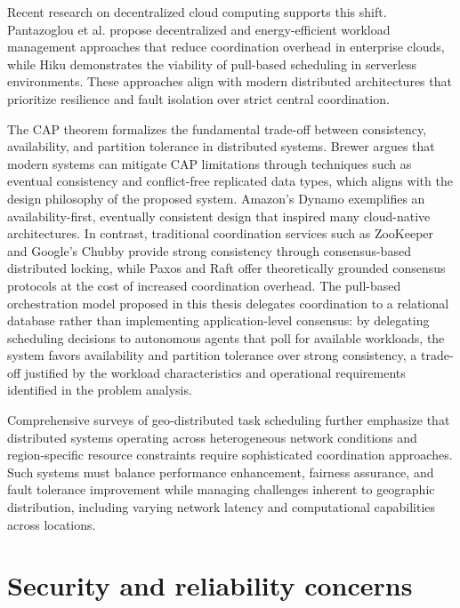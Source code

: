 Recent research on decentralized cloud computing supports this shift. Pantazoglou et al. \cite{pantazoglou2015decentralized} propose decentralized and energy-efficient workload management approaches that reduce coordination overhead in enterprise clouds, while Hiku \cite{hiku2025pull} demonstrates the viability of pull-based scheduling in serverless environments. These approaches align with modern distributed architectures that prioritize resilience and fault isolation over strict central coordination.

The CAP theorem \cite{brewer2012cap, gilbert2012cap} formalizes the fundamental trade-off between consistency, availability, and partition tolerance in distributed systems. Brewer \cite{brewer2012cap} argues that modern systems can mitigate CAP limitations through techniques such as eventual consistency and conflict-free replicated data types, which aligns with the design philosophy of the proposed system. Amazon's Dynamo \cite{decandia2007dynamo} exemplifies an availability-first, eventually consistent design that inspired many cloud-native architectures. In contrast, traditional coordination services such as ZooKeeper \cite{hunt2010zookeeper} and Google's Chubby \cite{burrows2006chubby} provide strong consistency through consensus-based distributed locking, while Paxos \cite{lamport2001paxos} and Raft \cite{ongaro2014raft} offer theoretically grounded consensus protocols at the cost of increased coordination overhead. The pull-based orchestration model proposed in this thesis delegates coordination to a relational database rather than implementing application-level consensus: by delegating scheduling decisions to autonomous agents that poll for available workloads, the system favors availability and partition tolerance over strong consistency, a trade-off justified by the workload characteristics and operational requirements identified in the problem analysis.

Comprehensive surveys of geo-distributed task scheduling \cite{wu2025task} further emphasize that distributed systems operating across heterogeneous network conditions and region-specific resource constraints require sophisticated coordination approaches. Such systems must balance performance enhancement, fairness assurance, and fault tolerance improvement while managing challenges inherent to geographic distribution, including varying network latency and computational capabilities across locations.


\section{Security and reliability concerns}

